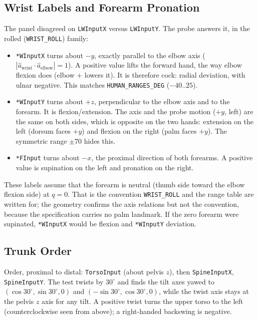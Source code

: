 \documentclass[11pt,a4paper]{article}
\begin{document}
\subsection{Wrist Labels and Forearm Pronation}
\label{sec:wrist}

The panel disagreed on \texttt{LWInputX} versus \texttt{LWInputY}.  The probe
answers it, in the rolled (\texttt{WRIST\_ROLL}) family:
\begin{itemize}[nosep]
  \item \texttt{*WInputX} turns about $-y$, exactly parallel to the elbow axis
    ($|\hat a_{\mathrm{wrist}}\cdot\hat a_{\mathrm{elbow}}|=1$).  A positive
    value lifts the forward hand, the way elbow flexion does (elbow $+$ lowers
    it).  It is therefore cock: radial deviation, with ulnar negative.  This
    matches \texttt{HUMAN\_RANGES\_DEG} ($-40..25$).
  \item \texttt{*WInputY} turns about $+z$, perpendicular to the elbow axis and
    to the forearm.  It is flexion/extension.  The axis and the probe motion
    ($+y$, left) are the same on both sides, which is opposite on the two
    hands: extension on the left (dorsum faces $+y$) and flexion on the right
    (palm faces $+y$).  The symmetric range $\pm70$ hides this.
  \item \texttt{*FInput} turns about $-x$, the proximal direction of both
    forearms.  A positive value is supination on the left and pronation on the
    right.
\end{itemize}
These labels assume that the forearm is neutral (thumb side toward the elbow
flexion side) at $q=0$.  That is the convention \texttt{WRIST\_ROLL} and the
range table are written for; the geometry confirms the axis relations but not
the convention, because the specification carries no palm landmark.  If the
zero forearm were supinated, \texttt{*WInputX} would be flexion and
\texttt{*WInputY} deviation.

\subsection{Trunk Order}
Order, proximal to distal: \texttt{TorsoInput} (about pelvis $z$), then
\texttt{SpineInputX}, \texttt{SpineInputY}.  The test twists by $30^{\circ}$ and
finds the tilt axes yawed to $(\cos30^{\circ},\sin30^{\circ},0)$ and
$(-\sin30^{\circ},\cos30^{\circ},0)$, while the twist axis stays at the pelvis
$z$ axis for any tilt.  A positive twist turns the upper torso to the left
(counterclockwise seen from above); a right-handed backswing is negative.
\end{document}
